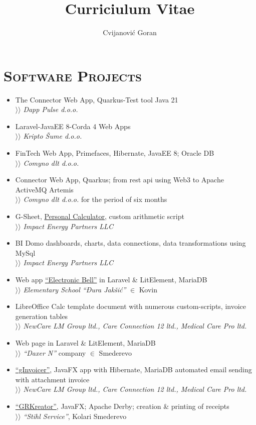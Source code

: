 \documentclass[12pt]{article}
\author{Cvijanović Goran}
\title{Curriciulum Vitae}
\begin{document}
\section{\textsc{Software Projects}}

\begin{itemize}[parsep=1.5pt]
    \item The Connector Web App, Quarkus-Test tool Java 21 \\
        $\rangle\!\rangle$ \textit{Dapp Pulse d.o.o.}
    \item Laravel-JavaEE 8-Corda 4 Web Apps \\
        $\rangle\!\rangle$ \textit{Kripto Šume d.o.o.}
    \item FinTech Web App, Primefaces, Hibernate, JavaEE 8; Oracle DB \\
        $\rangle\!\rangle$ \textit{Comyno dlt d.o.o.}
    \item Connector Web App, Quarkus; from rest api using Web3 to Apache ActiveMQ Artemis \\
        $\rangle\!\rangle$ \textit{Comyno dlt d.o.o.} for the period of six months
    \item G-Sheet, \href{https://docs.google.com/spreadsheets/d/1ztJoonmA0d0AyNDwVE1vnjpOPPpM03JF1eWCHwfQ4ZA/edit?usp=sharing}{Personal Calculator}, custom arithmetic script \\
        $\rangle\!\rangle$ \textit{Impact Energy Partners LLC}
    \item BI Domo dashboards, charts, data connections, data transformations using MySql \\
        $\rangle\!\rangle$ \textit{Impact Energy Partners LLC}
    \item Web app \href{https://zvono.nastavnikinformatike.com}{``Electronic Bell''} in Laravel \& LitElement, MariaDB \\
        $\rangle\!\rangle$ \textit{Elementary School ``Đura Jakšić''} $\in$ Kovin
    \item LibreOffice Calc template document with numerous custom-scripts, invoice generation tables \\ 
        $\rangle\!\rangle$ \textit{NewCare LM Group ltd., Care Connection 12 ltd., Medical Care Pro ltd.}
    \item Web page in Laravel \& LitElement, MariaDB \\
        $\rangle\!\rangle$ \textit{``Daxer N''} company $\in$ Smederevo
    \item \href{https://github.com/goranrsbg/gInvoicer}{``gInvoicer''}, JavaFX app with Hibernate, MariaDB automated email sending with attachment invoice \\
        $\rangle\!\rangle$ \textit{NewCare LM Group ltd., Care Connection 12 ltd., Medical Care Pro ltd.}
    \item \href{https://github.com/goranrsbg/GRKreator}{``GRKreator''}, JavaFX; Apache Derby; creation \& printing of receipts \\
        $\rangle\!\rangle$ \textit{``Stihl Service''}, Kolari Smederevo
\end{itemize}
\end{document}
